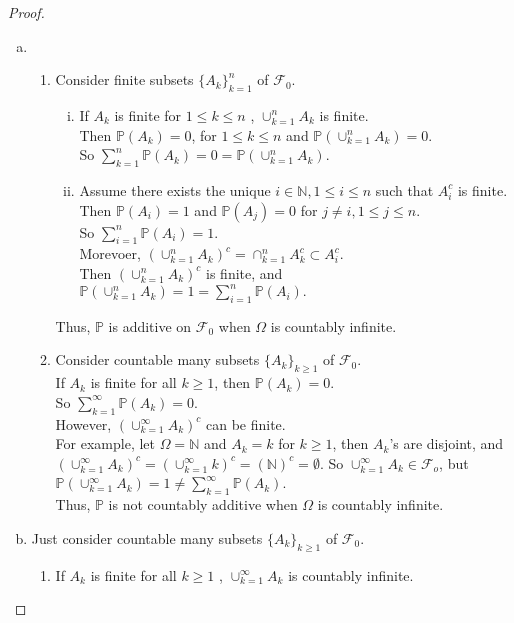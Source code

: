 \documentclass{article}
\newcommand{\bbp}{\mathbb{P}}
\newcommand{\bbn}{\mathbb{N}}
\newcommand{\llf}{\mathcal{F}}
\begin{document}
\begin{proof}
\begin{enumerate}[(a)]
	\item
		\begin{enumerate}[(1)]
		\item
		Consider finite subsets $\{A_k\}_{k=1}^n$ of $\llf_0$.
		\begin{enumerate}[(i)]
			\item If $A_k$ is finite for $1 \leq k \leq n$ , $\cup_{k=1}^n A_k$ is finite.\\
				Then $\bbp(A_k) = 0$, for $1 \leq k\leq n$ and $\bbp(\cup_{k=1}^n A_k) = 0.$\\
				So $\sum_{k=1}^n \bbp (A_k) = 0 = \bbp(\cup_{k=1}^n A_k)$.
			\item
			Assume there exists the unique $i \in \bbn, 1\leq i \leq n$ such that $A_i^c$ is finite.\\
			Then $\bbp(A_i) = 1$ and $\bbp(A_j) = 0$ for $j \neq i, 1 \leq j \leq n$.\\
			So $\sum_{i=1}^{n}\bbp(A_i) = 1.$ \\
			Morevoer, $(\cup_{k=1}^n A_k)^c  = \cap_{k=1}^n A_k^c \subset A_i^c $.\\
            Then $(\cup_{k=1}^n A_k)^c$ is finite, and $\bbp(\cup_{k=1}^n A_k) = 1 = \sum_{i=1}^{n}\bbp(A_i).$ 
			\end{enumerate}
        Thus, $\bbp$ is additive on $\llf_0$ when $\Omega$ is countably infinite.
		\item
		Consider countable many subsets $\{A_k\}_{k\geq 1}$ of $\llf_0$.\\
			If $A_k$ is finite for all $k \geq 1$, then $\bbp(A_k) = 0$. \\
			So $\sum_{k=1}^{\infty} \bbp (A_k) = 0$. \\
				However, $(\cup_{k=1}^{\infty} A_k)^c$ can be finite. \\
				For example, let $\Omega = \bbn$ and $A_k = k$ for $k \geq 1$, then $A_k$\rq s are disjoint,  and $(\cup_{k=1}^{\infty}{A_k})^c = ({ \cup_{k=1}^{\infty} }k)^c =(\bbn)^c = \emptyset$. So $\cup_{k=1}^{\infty}{A_k} \in \llf_o$, but $\bbp(\cup_{k=1}^{\infty}{A_k}) = 1 \neq \sum_{k=1}^{\infty} \bbp (A_k) $.\\
		Thus, $\bbp$ is not countably additive when $\Omega$ is countably infinite.
		\end{enumerate}
	\item
    	Just consider countable many subsets $\{A_k\}_{k\geq 1}$ of $\llf_0$.
		\begin{enumerate}[(1)]
			\item If $A_k$ is finite for all $k \geq 1$ , $\cup_{k=1}^{\infty} A_k$ is countably infinite.\\

\end{enumerate}
\end{enumerate}
\end{proof}
\end{document}
